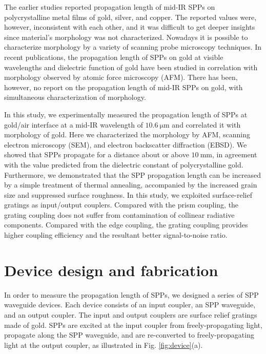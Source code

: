 \documentclass[aip,apl,reprint]{revtex4-1}
\begin{document}
The earlier studies reported propagation length of mid-IR SPPs on polycrystalline metal films of gold,\cite{McMullen, Schlesinger1, Schlesinger2} silver,\cite{Schlesinger1, Schlesinger2} and copper.\cite{Schoenwald, Shiba} The reported values were, however, inconsistent with each other, and it was difficult to get deeper insights since material's morphology was not characterized. Nowadays it is possible to characterize morphology by a variety of scanning probe microscopy techniques. In recent publications, the propagation length of SPPs on gold at visible wavelengths\cite{Kuttge} and dielectric function of gold\cite{Trollmann, Olmon} have been studied in correlation with morphology observed by atomic force microscopy (AFM). There has been, however, no report on the propagation length of mid-IR SPPs on gold, with simultaneous characterization of morphology.

In this study, we experimentally measured the propagation length of SPPs at gold/air interface at a mid-IR wavelength of $10.6\:\mathrm{\mu m}$ and correlated it with morphology of gold. Here we characterized the morphology by AFM, scanning electron microscopy (SEM), and electron backscatter diffraction (EBSD). We showed that SPPs propagate for a distance about or above $10\:\mathrm{mm}$, in agreement with the value predicted from the dielectric constant of polycrystalline gold. Furthermore, we demonstrated that the SPP propagation length can be increased by a simple treatment of thermal annealing, accompanied by the increased grain size and suppressed surface roughness.
In this study, we exploited surface-relief gratings as input/output couplers. Compared with the prism coupling,\cite{Schoenwald, Shiba} the grating coupling does not suffer from contamination of collinear radiative components.\cite{Schlesinger1, Schlesinger2} Compared with the edge coupling,\cite{Schlesinger1, Schlesinger2} the grating coupling provides higher coupling efficiency and the resultant better signal-to-noise ratio. 

\section{Device design and fabrication}
\label{sec:device}
In order to measure the propagation length of SPPs, we designed a series of SPP waveguide devices. Each device consists of an input coupler, an SPP waveguide, and an output coupler.  The input and output couplers are surface relief gratings made of gold. SPPs are  excited at the input coupler from freely-propagating light, propagate along the SPP waveguide, and are re-converted to freely-propagating light at the output coupler, as illustrated in Fig. \ref{fig:device}(a). 
\end{document}
